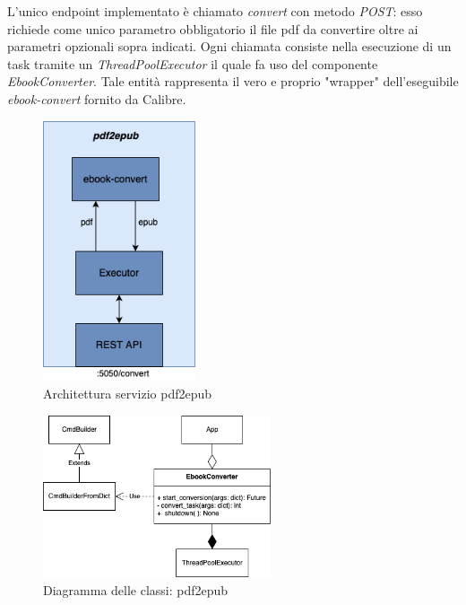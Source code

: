 L'unico endpoint implementato è chiamato \textit{convert} con metodo \textit{POST}: esso richiede come unico parametro obbligatorio il file pdf da convertire oltre ai parametri opzionali sopra indicati. Ogni chiamata consiste nella esecuzione di un task tramite un \textit{ThreadPoolExecutor} il quale fa uso del componente \textit{EbookConverter}. Tale entità rappresenta il vero e proprio "wrapper" dell'eseguibile \textit{ebook-convert} fornito da Calibre.
\begin{figure}[H]
\centering
\includegraphics[width=0.4\textwidth]{img/tesi-4-pdf2epub.drawio.png}
\caption{Architettura servizio pdf2epub}
\end{figure}
\begin{figure}[H]
\centering
\includegraphics[width=0.6\textwidth]{img/tesi-5-pdf2epub.drawio.png}
\caption{Diagramma delle classi: pdf2epub}
\end{figure}

